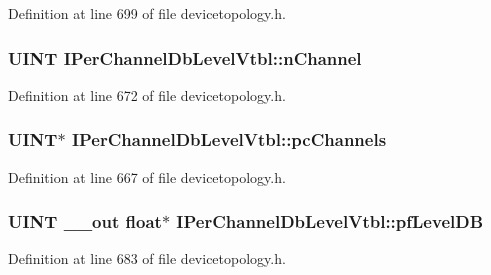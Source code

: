 Definition at line 699 of file devicetopology.\+h.

\subsubsection[{\texorpdfstring{n\+Channel}{nChannel}}]{ {\bf U\+I\+NT} I\+Per\+Channel\+Db\+Level\+Vtbl\+::n\+Channel}\hypertarget{struct_i_per_channel_db_level_vtbl_a4416cf4648bb0072e1db43ee9091b879}{}\label{struct_i_per_channel_db_level_vtbl_a4416cf4648bb0072e1db43ee9091b879}


Definition at line 672 of file devicetopology.\+h.

\subsubsection[{\texorpdfstring{pc\+Channels}{pcChannels}}]{ {\bf U\+I\+NT}$\ast$ I\+Per\+Channel\+Db\+Level\+Vtbl\+::pc\+Channels}\hypertarget{struct_i_per_channel_db_level_vtbl_add781cb1077b643d5a4ae262fe04ab51}{}\label{struct_i_per_channel_db_level_vtbl_add781cb1077b643d5a4ae262fe04ab51}


Definition at line 667 of file devicetopology.\+h.

\subsubsection[{\texorpdfstring{pf\+Level\+DB}{pfLevelDB}}]{ {\bf U\+I\+NT} {\bf \+\_\+\+\_\+out} float$\ast$ I\+Per\+Channel\+Db\+Level\+Vtbl\+::pf\+Level\+DB}\hypertarget{struct_i_per_channel_db_level_vtbl_af63650d368bd6535fcd8a0cfade000c8}{}\label{struct_i_per_channel_db_level_vtbl_af63650d368bd6535fcd8a0cfade000c8}


Definition at line 683 of file devicetopology.\+h.

